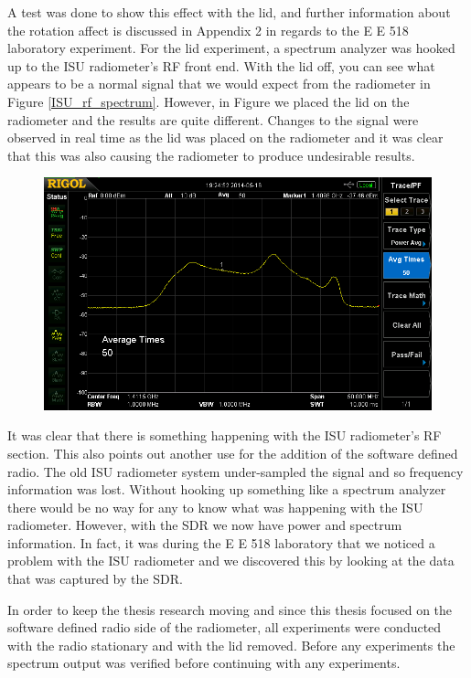 A test was done to show this effect with the lid, and further information about the rotation affect is discussed in Appendix 2 in regards to the E E 518 laboratory experiment. For the lid experiment, a spectrum analyzer was hooked up to the ISU radiometer's RF front end.  With the lid off, you can see what appears to be a normal signal that we would expect from the radiometer in Figure \ref{ISU_rf_spectrum}.  However, in Figure we placed the lid on the radiometer and the results are quite different.  Changes to the signal were observed in real time as the lid was placed on the radiometer and it was clear that this was also causing the radiometer to produce undesirable results.  

{\begin{figure}[h!tb] 
\centering
\includegraphics[width=17cm]{Images/lidpart.png}
\label{lid_on}
\end{figure}
}

It was clear that there is something happening with the ISU radiometer's RF section.  This also points out another use for the addition of the software defined radio.  The old ISU radiometer system under-sampled the signal and so frequency information was lost.  Without hooking up something like a spectrum analyzer there would be no way for any to know what was happening with the ISU radiometer.  However, with the SDR we now have power and spectrum information.  In fact, it was during the E E 518 laboratory that we noticed a problem with the ISU radiometer and we discovered this by looking at the data that was captured by the SDR.  

In order to keep the thesis research moving and since this thesis focused on the software defined radio side of the radiometer, all experiments were conducted with the radio stationary and with the lid removed.  Before any experiments the spectrum output was verified before continuing with any experiments.  

